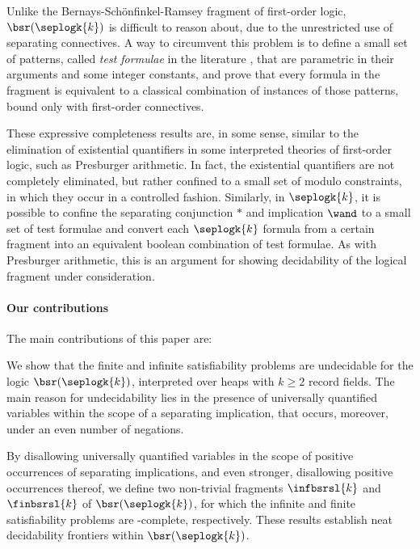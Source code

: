 Unlike the Bernays-Sch\"onfinkel-Ramsey fragment of first-order logic,
$\bsr(\seplogk{k})$ is difficult to reason about, due to the
unrestricted use of separating connectives. A way to circumvent this
problem is to define a small set of patterns, called \emph{test
  formulae} in the literature
\cite{PhD-lozes,BrocheninDemriLozes11,DemriDeters14,DemriGalmicheWendlingMery14},
that are parametric in their arguments and some integer constants, and
prove that every formula in the fragment is equivalent to a classical
combination of instances of those patterns, bound only with
first-order connectives.

These expressive completeness results are, in some sense, similar to
the elimination of existential quantifiers in some interpreted
theories of first-order logic, such as Presburger arithmetic. In fact,
the existential quantifiers are not completely eliminated, but rather
confined to a small set of modulo constraints, in which they occur in
a controlled fashion. Similarly, in $\seplogk{k}$, it is possible to
confine the separating conjunction $*$ and implication $\wand$ to a
small set of test formulae and convert each $\seplogk{k}$ formula from
a certain fragment into an equivalent boolean combination of test
formulae. As with Presburger arithmetic, this is an argument for
showing decidability of the logical fragment under consideration.

\paragraph{Our contributions} The main contributions of this paper are:
\begin{compactenum}
\item We show that the finite and infinite satisfiability problems are
  undecidable for the logic $\bsr(\seplogk{k})$, interpreted over
  heaps with $k\geq2$ record fields. The main reason for undecidability
  lies in the presence of universally quantified variables within the
  scope of a separating implication, that occurs, moreover, under an
  even number of negations.
\item By disallowing universally quantified variables in the scope of
  positive occurrences of separating implications, and even stronger,
  disallowing positive occurrences thereof, we define two non-trivial
  fragments $\infbsrsl{k}$ and $\finbsrsl{k}$ of $\bsr(\seplogk{k})$,
  for which the infinite and finite satisfiability problems
  are \pspace-complete, respectively. These results establish neat
  decidability frontiers within $\bsr(\seplogk{k})$.
\end{compactenum}

